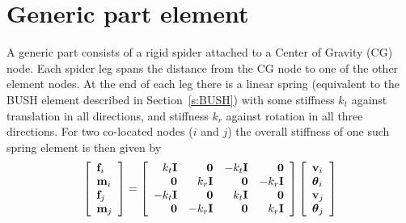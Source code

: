 %
%

%
%

\section{Generic part element}
\label{sec:GenericPart}

A generic part consists of a rigid spider attached to
a Center of Gravity (CG) node.
Each spider leg spans the distance from the CG node to
one of the other element nodes.
At the end of each leg there is a linear spring (equivalent to the BUSH element
described in Section~\ref{s:BUSH}) with some stiffness $k_t$ against translation
in all directions, and stiffness $k_r$ against rotation in all three directions.
For two co-located nodes ($i$ and $j$) the overall stiffness
of one such spring element is then given by
%
\begin{equation}
\label{eq:leg stiffness}
\left[\begin{array}{l}
{\bf f}_i \\ {\bf m}_i \\ {\bf f}_j \\ {\bf m}_j
\end{array}\right] =
\left[\begin{array}{rrrr}
 k_t {\bf I} &      {\bf 0} & -k_t {\bf I} &      {\bf 0} \\
     {\bf 0} &  k_r {\bf I} &      {\bf 0} & -k_r {\bf I} \\
-k_t {\bf I} &      {\bf 0} &  k_t {\bf I} &      {\bf 0} \\
     {\bf 0} & -k_r {\bf I} &      {\bf 0} &  k_r {\bf I}
\end{array}\right]
\left[\begin{array}{l}
{\bf v}_i \\ {\boldsymbol{\theta}}_i \\ {\bf v}_j \\ {\boldsymbol{\theta}}_j
\end{array}\right]
\end{equation}

